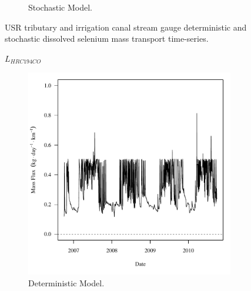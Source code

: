 \begin{linenumbers}
\begin{landscape}
\begin{figure}
\begin{subfigure}{0.7\textwidth}
			\caption{Stochastic Model.}
		\end{subfigure}
		\caption{USR tributary and irrigation canal stream gauge deterministic and stochastic dissolved selenium mass transport time-series.}
	\end{figure}
\end{landscape}
\subfiguremid
\begin{landscape}
	\begin{figure}
		$ \displaystyle L_{HRC194CO} $
		\begin{subfigure}{0.7\textwidth}
			\centering
			\includegraphics[width=\tableCustomSize]{"Figures/Results_USR/Deterministic/f HRC"}
			\caption{Deterministic Model.}
		\end{subfigure}%
		\begin{subfigure}{0.7\textwidth}
			\centering

\end{subfigure}
\end{figure}
\end{landscape}
\end{linenumbers}

